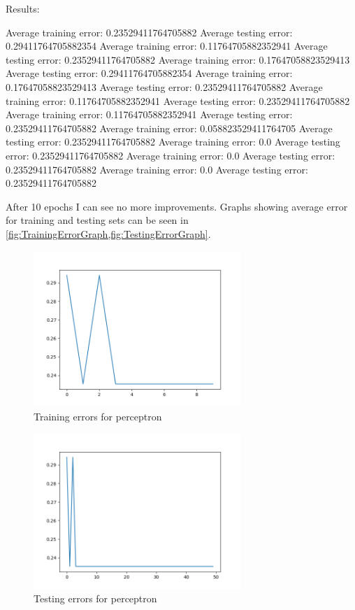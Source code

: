 \documentclass[a4,12pt]{extarticle}
\begin{document}
Results:
\begin{verbatim*}
Average training error: 0.23529411764705882
Average testing error: 0.29411764705882354
Average training error: 0.11764705882352941
Average testing error: 0.23529411764705882
Average training error: 0.17647058823529413
Average testing error: 0.29411764705882354
Average training error: 0.17647058823529413
Average testing error: 0.23529411764705882
Average training error: 0.11764705882352941
Average testing error: 0.23529411764705882
Average training error: 0.11764705882352941
Average testing error: 0.23529411764705882
Average training error: 0.058823529411764705
Average testing error: 0.23529411764705882
Average training error: 0.0
Average testing error: 0.23529411764705882
Average training error: 0.0
Average testing error: 0.23529411764705882
Average training error: 0.0
Average testing error: 0.23529411764705882
\end{verbatim*}
After 10 epochs I can see no more improvements. Graphs showing average error for training and testing sets can be seen in \cref{fig:TrainingErrorGraph,fig:TestingErrorGraph}.
\begin{figure}[H]
  \centering
  \includegraphics[width=0.7\textwidth]{TrainingErrorGraph}
  \caption{Training errors for perceptron}
  \label{fig:TrainingErrorGraph}
\end{figure}
\begin{figure}[H]
  \centering
  \includegraphics[width=0.7\textwidth]{TestingErrorGraph}
  \caption{Testing errors for perceptron}
  \label{fig:TestingErrorGraph}
\end{figure}
\end{document}
